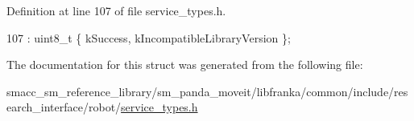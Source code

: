Definition at line 107 of file service\+\_\+types.\+h.


\begin{DoxyCode}
107 : uint8\_t \{ kSuccess, kIncompatibleLibraryVersion \};
\end{DoxyCode}


The documentation for this struct was generated from the following file\+:\begin{DoxyCompactItemize}
\item 
smacc\+\_\+sm\+\_\+reference\+\_\+library/sm\+\_\+panda\+\_\+moveit/libfranka/common/include/research\+\_\+interface/robot/\hyperlink{service__types_8h}{service\+\_\+types.\+h}\end{DoxyCompactItemize}
